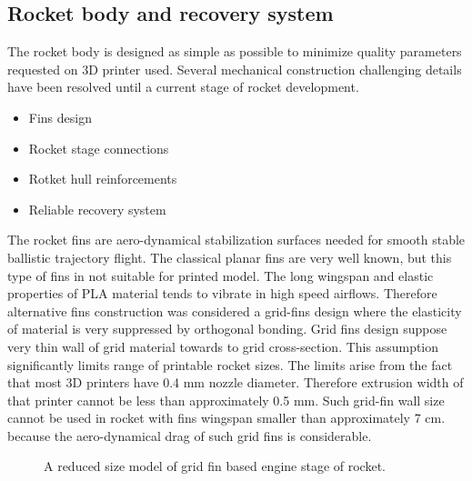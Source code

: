 \documentclass{poster16}
\begin{document}
\subsection{Rocket body and recovery system}

The rocket body is designed as simple as possible to minimize quality parameters requested on 3D printer used. Several mechanical construction challenging details have been resolved until a current stage of rocket development. 

\begin{itemize}
\item Fins design
\item Rocket stage connections
\item Rotket hull reinforcements
\item Reliable recovery system
\end{itemize}

The rocket fins are aero-dynamical stabilization surfaces needed for smooth stable ballistic trajectory flight.  The classical planar fins are very well known, but this type of fins in not suitable for printed model.  The long wingspan and elastic properties of PLA material tends to vibrate in high speed airflows.
Therefore alternative fins construction was considered a grid-fins design \cite{grid_fins} where the elasticity of material is very suppressed by orthogonal bonding.
Grid fins design suppose very thin wall of grid material towards to grid cross-section. This assumption significantly limits range of printable rocket sizes. The limits arise from the fact that most 3D printers have 0.4 mm nozzle diameter. Therefore extrusion width of that printer cannot be less than approximately 0.5 mm. Such grid-fin wall size cannot be used in rocket with fins wingspan smaller than approximately 7 cm. because the aero-dynamical drag of such grid fins is considerable. 

\begin{figure}[ht]
\begin{center}
\caption{A reduced size model of grid fin based engine stage of rocket. } 
\label{fig:grid_fin}
\end{center}
\end{figure}
\end{document}
